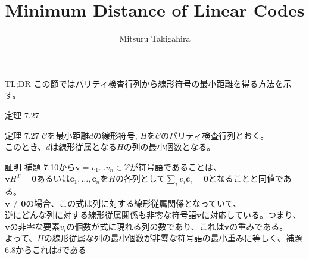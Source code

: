 \documentclass[dvipdfmx,10pt,jsarticle]{beamer}
\title{Minimum Distance of Linear Codes}
\author{Mitsuru Takigahira}
\date[2017/12/01]{}
\newcommand{\code}[1]{\mathcal{#1}}
\newcommand{\vs}[1]{\mathcal{#1}}
\renewcommand{\vec}[1]{\mathbf{#1}}
\begin{document}
  \frame{\maketitle}

  \begin{frame}{TL;DR}
    この節ではパリティ検査行列から線形符号の最小距離を得る方法を示す。
  \end{frame}

  \begin{frame}{定理 7.27}
    \begin{block}{定理 7.27}
      $\code{C}$を最小距離$d$の線形符号, $H$を$\code{C}$のパリティ検査行列とおく。 \\
      このとき、$d$は線形従属となる$H$の列の最小個数となる。
    \end{block}
    \begin{block}{証明}
      補題 7.10から$\vec{v} = v_1\ldots v_n \in \vs{V}$が符号語であることは、\\
      $\vec{v}H^T = \vec{0}$あるいは$\vec{c}_1, \ldots, \vec{c}_n$を$H$の各列として$\sum_{i} v_i \vec{c}_i = \vec{0}$となることと同値である。 \\
      $\vec{v} \neq \vec{0}$の場合、この式は列に対する線形従属関係となっていて、  \\
      逆にどんな列に対する線形従属関係も非零な符号語$\vec{v}$に対応している。つまり、 \\
      $\vec{v}$の非零な要素$v_i$の個数が式に現れる列の数であり、これは$\vec{v}$の重みである。 \\
      よって、$H$の線形従属な列の最小個数が非零な符号語の最小重みに等しく、補題 6.8からこれは$d$である
    \end{block}
  \end{frame}
\end{document}
